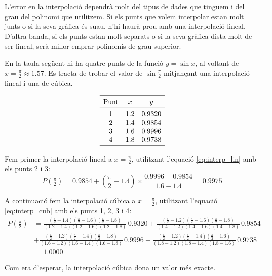 L'error en la interpolació dependrà molt del tipus de dades que tinguem i del grau del polinomi que utilitzem. Si els punts que volem interpolar estan molt junts o si la seva gràfica és suau, n'hi haurà prou amb una interpolació lineal. D'altra banda, si els punts estan molt separats o si la seva gràfica dista molt de ser lineal, serà millor emprar polinomis de grau superior.


\begin{exemple}
    En la taula següent hi ha quatre punts de la funció $y = \sin x$, al voltant de $x=\frac{\pi}{2}\approx\num{1,57}$. Es tracta de trobar el valor de $\sin \frac{\pi}{2}$ mitjançant una interpolació lineal i una de cúbica.
    \vspace{-8mm}
    \begin{center}
        \[\begin{array}{ccc}
           \toprule[1pt]
              \text{Punt} & x  & y \\
           \midrule
              1 & \num{1,2} & \num{0,9320} \\
              2 & \num{1,4} & \num{0,9854} \\
              3 & \num{1,6} & \num{0,9996} \\
              4 & \num{1,8} & \num{0,9738} \\
           \bottomrule[1pt]
        \end{array} \]
    \end{center}

    Fem primer la interpolació lineal a $x= \frac{\pi}{2}$, utilitzant l'equació \eqref{eq:interp_lin} amb els punts 2 i 3:
    \[ P\left(\tfrac{\pi}{2}\right) = \num{0,9854}+\left(\frac{\pi}{2}-\num{1,4}\right)\times\frac{\num{0,9996}-\num{0,9854}}{\num{1,6}-\num{1,4}}=
    \num{0,9975} \]

    A continuació fem la interpolació cúbica a $x= \frac{\pi}{2}$, utilitzant l'equació \eqref{eq:interp_cub} amb els punts 1, 2, 3 i 4:
    \[\begin{split}
      P\left(\tfrac{\pi}{2}\right) &= \frac{(\tfrac{\pi}{2}-\num{1,4})(\tfrac{\pi}{2}-\num{1,6})(\tfrac{\pi}{2}-\num{1,8})}{(\num{1,2}-\num{1,4})(\num{1,2}-\num{1,6})(\num{1,2}-\num{1,8})}\, \num{0,9320} +
              \frac{(\tfrac{\pi}{2}-\num{1,2})(\tfrac{\pi}{2}-\num{1,6})(\tfrac{\pi}{2}-\num{1,8})}{(\num{1,4}-\num{1,2})(\num{1,4}-\num{1,6})(\num{1,4}-\num{1,8})}\, \num{0,9854} + {} \\[1.5ex]
           &+ \frac{(\tfrac{\pi}{2}-\num{1,2})(\tfrac{\pi}{2}-\num{1,4})(\tfrac{\pi}{2}-\num{1,8})}{(\num{1,6}-\num{1,2})(\num{1,6}-\num{1,4})(\num{1,6}-\num{1,8})}\, \num{0,9996}+
              \frac{(\tfrac{\pi}{2}-\num{1,2})(\tfrac{\pi}{2}-\num{1,4})(\tfrac{\pi}{2}-\num{1,6})}{(\num{1,8}-\num{1,2})(\num{1,8}-\num{1,4})(\num{1,8}-\num{1,6})}\, \num{0,9738} = {} \\[1.5ex]
           &= \num{1,0000}
    \end{split}\]


    Com era d'esperar, la interpolació cúbica dona un valor més exacte.
\end{exemple}

